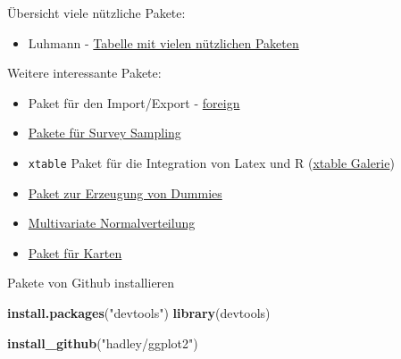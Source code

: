 \documentclass[
  ignorenonframetext,
]{beamer}
\newenvironment{Shaded}{\begin{snugshade}}{\end{snugshade}}
\newcommand{\KeywordTok}[1]{\textcolor[rgb]{0.26,0.66,0.93}{\textbf{#1}}}
\newcommand{\NormalTok}[1]{\textcolor[rgb]{0.74,0.68,0.62}{#1}}
\newcommand{\StringTok}[1]{\textcolor[rgb]{0.02,0.61,0.04}{#1}}
\providecommand{\tightlist}{%
  \setlength{\itemsep}{0pt}\setlength{\parskip}{0pt}}
\begin{document}
\begin{frame}[fragile]{Übersicht viele nützliche Pakete:}
\protect\hypertarget{ubersicht-viele-nutzliche-pakete}{}

\begin{itemize}
\tightlist
\item
  Luhmann -
  \href{http://www.beltz.de/fileadmin/beltz/downloads/OnlinematerialienPVU/28090_Luhmann/Verwendete\%20Pakete.pdf}{Tabelle
  mit vielen nützlichen Paketen}
\end{itemize}

Weitere interessante Pakete:

\begin{itemize}
\item
  Paket für den Import/Export -
  \href{http://cran.r-project.org/web/packages/foreign/foreign.pdf}{foreign}
\item
  \href{http://iase-web.org/documents/papers/icots8/ICOTS8_4J1_TILLE.pdf}{Pakete
  für Survey Sampling}
\item
  \texttt{xtable} Paket für die Integration von Latex und R
  (\href{http://cran.r-project.org/web/packages/xtable/vignettes/xtableGallery.pdf}{xtable
  Galerie})
\item
  \href{http://cran.r-project.org/web/packages/dummies/dummies.pdf}{Paket
  zur Erzeugung von Dummies}
\item
  \href{http://cran.r-project.org/web/packages/mvtnorm/index.html}{Multivariate
  Normalverteilung}
\item
  \href{http://www.r-bloggers.com/tag/maptools/}{Paket für Karten}
\end{itemize}

\end{frame}

\begin{frame}[fragile]{Pakete von Github installieren}
\protect\hypertarget{pakete-von-github-installieren}{}

\begin{Shaded}
\begin{Highlighting}[]
\KeywordTok{install.packages}\NormalTok{(}\StringTok{"devtools"}\NormalTok{)}
\KeywordTok{library}\NormalTok{(devtools)}

\KeywordTok{install_github}\NormalTok{(}\StringTok{"hadley/ggplot2"}\NormalTok{)}
\end{Highlighting}
\end{Shaded}

\end{frame}
\end{document}
